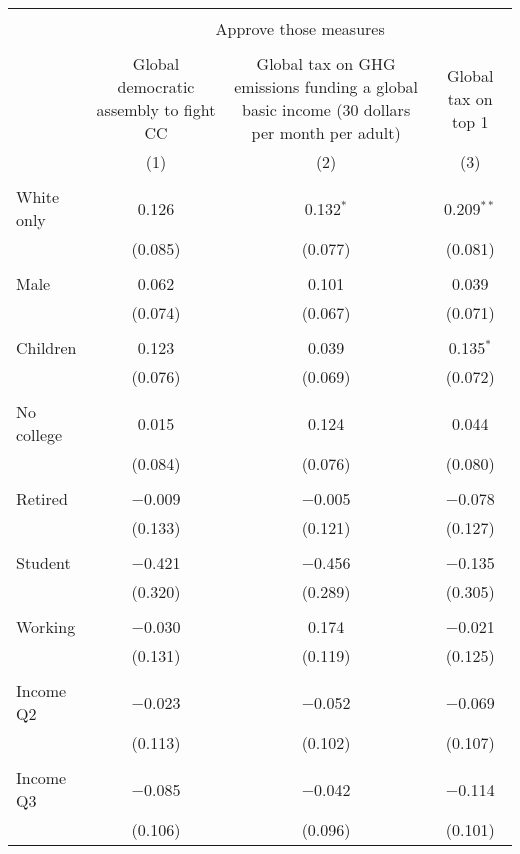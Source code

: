 
\begin{tabular}{@{\extracolsep{5pt}}lccc} 
\\[-1.8ex]\hline 
\hline \\[-1.8ex] 
 & \multicolumn{3}{c}{Approve those measures} \\ 
\cline{2-4} 
\\[-1.8ex] & Global democratic assembly to fight CC & Global tax on GHG emissions funding a global basic income (30 dollars per month per adult) & Global tax on top 1%
\\[-1.8ex] & (1) & (2) & (3)\\ 
\hline \\[-1.8ex] 
 White only & 0.126 & 0.132$^{*}$ & 0.209$^{**}$ \\ 
  & (0.085) & (0.077) & (0.081) \\ 
  & & & \\ 
 Male & 0.062 & 0.101 & 0.039 \\ 
  & (0.074) & (0.067) & (0.071) \\ 
  & & & \\ 
 Children & 0.123 & 0.039 & 0.135$^{*}$ \\ 
  & (0.076) & (0.069) & (0.072) \\ 
  & & & \\ 
 No college & 0.015 & 0.124 & 0.044 \\ 
  & (0.084) & (0.076) & (0.080) \\ 
  & & & \\ 
 Retired & $-$0.009 & $-$0.005 & $-$0.078 \\ 
  & (0.133) & (0.121) & (0.127) \\ 
  & & & \\ 
 Student & $-$0.421 & $-$0.456 & $-$0.135 \\ 
  & (0.320) & (0.289) & (0.305) \\ 
  & & & \\ 
 Working & $-$0.030 & 0.174 & $-$0.021 \\ 
  & (0.131) & (0.119) & (0.125) \\ 
  & & & \\ 
 Income Q2 & $-$0.023 & $-$0.052 & $-$0.069 \\ 
  & (0.113) & (0.102) & (0.107) \\ 
  & & & \\ 
 Income Q3 & $-$0.085 & $-$0.042 & $-$0.114 \\ 
  & (0.106) & (0.096) & (0.101) \\ 

\end{tabular}
